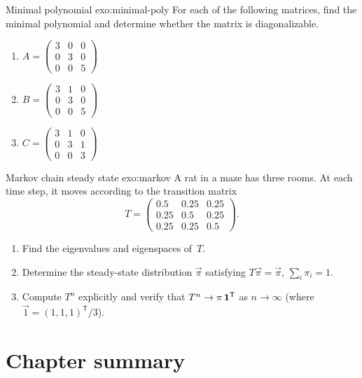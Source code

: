 \begin{exercise}{Minimal polynomial \challenging}{exo:minimal-poly}
For each of the following matrices, find the minimal polynomial and
determine whether the matrix is diagonalizable.
\begin{enumerate}[label=(\alph*)]
  \item $A = \begin{pmatrix} 3 & 0 & 0 \\ 0 & 3 & 0 \\ 0 & 0 & 5
    \end{pmatrix}$
  \item $B = \begin{pmatrix} 3 & 1 & 0 \\ 0 & 3 & 0 \\ 0 & 0 & 5
    \end{pmatrix}$
  \item $C = \begin{pmatrix} 3 & 1 & 0 \\ 0 & 3 & 1 \\ 0 & 0 & 3
    \end{pmatrix}$
\end{enumerate}
\end{exercise}

\begin{exercise}{Markov chain steady state \intermediate}{exo:markov}
A rat in a maze has three rooms.  At each time step, it moves
according to the transition matrix
\[
  T = \begin{pmatrix} 0.5 & 0.25 & 0.25 \\ 0.25 & 0.5 & 0.25 \\
  0.25 & 0.25 & 0.5 \end{pmatrix}.
\]
\begin{enumerate}[label=(\alph*)]
  \item Find the eigenvalues and eigenspaces of~$T$.
  \item Determine the steady-state distribution $\vec{\pi}$ satisfying
    $T\vec{\pi} = \vec{\pi}$, $\sum_i \pi_i = 1$.
  \item Compute $T^n$ explicitly and verify that
    $T^n \to \mathbf{\pi}\,{\mathbf{1}}^{\mathsf{T}}$ as $n\to\infty$ (where
    $\vec{1} = (1,1,1)^{\mathsf{T}}/3$).
\end{enumerate}
\end{exercise}


\section{Chapter summary}\label{sec:eigenvalue-summary}

